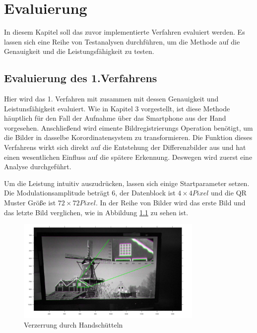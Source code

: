 \chapter{Evaluierung} \label{cha:Evaluierung}

In diesem Kapitel soll das zuvor implementierte Verfahren evaluiert werden. Es lassen sich eine Reihe von Testanalysen durchführen, um die Methode auf die Genauigkeit und die Leistungsfähigkeit zu testen.


\section{Evaluierung des 1.Verfahrens}

Hier wird das 1. Verfahren mit zusammen mit dessen Genauigkeit und Leistunsfähigkeit evaluiert. Wie in Kapitel 3 vorgestellt, ist diese Methode häuptlich für den Fall der Aufnahme über das Smartphone aus der Hand vorgesehen. Anschließend wird eimente Bildregistrierungs Operation benötigt, um die Bilder in dasselbe Korordinatensystem zu transformieren. Die Funktion dieses Verfahrens wirkt sich direkt auf die Entstehung der Differenzbilder aus und hat einen wesentlichen Einfluss auf die spätere Erkennung. Deswegen wird zuerst eine Analyse durchgeführt.

Um die Leistung intuitiv auszudrücken, lassen sich einige Startparameter setzen. Die Modulationsamplitude beträgt 6, der Datenblock ist $ 4 \times 4 Pixel$ und die QR Muster Größe ist $ 72 \times 72 Pixel $.  In der Reihe von Bilder wird das erste Bild und das letzte Bild verglichen, wie in Abbildung \ref{fig:vorregistration} zu sehen ist. 
\begin{figure}[H]
 \centering 
  \includegraphics[keepaspectratio,width=0.8\textwidth]{images/5_Implementirung/vorregistration.pdf}
 \caption{Verzerrung durch Handschütteln}
 \label{fig:vorregistration}
\end{figure}

